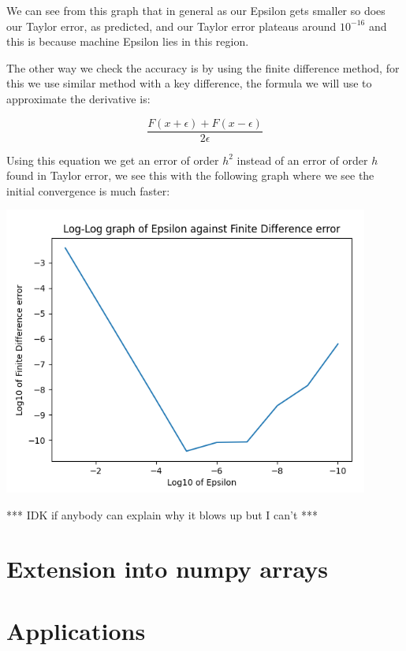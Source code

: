 \documentclass{article}
\begin{document}
We can see from this graph that in general as our Epsilon gets smaller so does our Taylor error, as predicted, and our Taylor error plateaus around $10^{-16}$ and this is because machine Epsilon lies in this region.

The other way we check the accuracy is by using the finite difference method, for this we use similar method with a key difference, the formula we will use to approximate the derivative is:

\begin{equation}
    \frac{F(x + \epsilon) + F(x - \epsilon)}{2 \epsilon}
\end{equation}

Using this equation we get an error of order $h^2$ instead of an error of order $h$ found in Taylor error, we see this with the following graph where we see the initial convergence is much faster:

\begin{center}
    \includegraphics[width=12cm]{images/Finite_Difference_error_1.png}
\end{center}

*** IDK if anybody can explain why it blows up but I can't ***

\section{Extension into numpy arrays}

\section{Applications}
\end{document}
